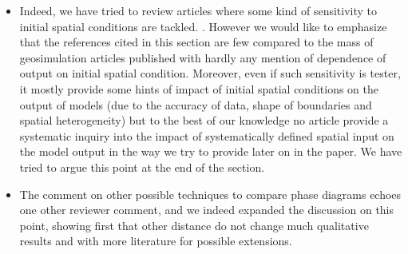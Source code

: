 \documentclass[11pt,a4paper,sans]{moderncv}        %
\begin{document}
\begin{itemize}
	\item Indeed, we have tried to review articles where some kind of sensitivity to initial spatial conditions are tackled. . However we would like to emphasize that the references cited in this section are few compared to the mass of geosimulation articles published with hardly any mention of dependence of output on initial spatial condition. Moreover, even if such sensitivity is tester, it mostly provide some hints of impact of initial spatial conditions on the output of models (due to the accuracy of data, shape of boundaries and spatial heterogeneity) but to the best of our knowledge no article provide a systematic inquiry into the impact of systematically defined spatial input on the model output in the way we try to provide later on in the paper. We have tried to argue this point at the end of the section.
	
	\item The comment on other possible techniques to compare phase diagrams echoes one other reviewer comment, and we indeed expanded the discussion on this point, showing first that other distance do not change much qualitative results and with more literature for possible extensions.
	

\end{itemize}
\end{document}
